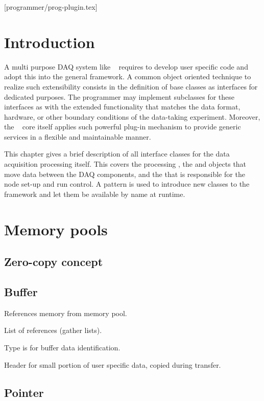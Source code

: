 [programmer/prog-plugin.tex]
\section{Introduction}
A multi purpose DAQ system like \dabc~ requires to develop user specific code and adopt
this into the general framework. A common object oriented technique to realize such
extensibility consists in the definition of base classes as interfaces for dedicated purposes.
The programmer may implement subclasses for these interfaces as 
with the extended functionality that matches the data format, hardware, or other boundary conditions of the
data-taking experiment. Moreover, the  \dabc~ core itself applies such powerful plug-in mechanism to provide 
generic services in a flexible and maintainable manner.   

This chapter gives a brief description of all interface classes for the data acquisition 
processing itself. This covers the processing , the  and 
 objects that move data between the DAQ components, 
and the  that is responsible for the node set-up and run control.
A  pattern is used to introduce new classes to the framework and let them
be available by name at runtime.


\section{Memory pools}

\subsection{Zero-copy concept}

\subsection{Buffer}

References memory from memory pool.
 
List of references (gather lists).

Type is for buffer data identification.

Header for small portion of user specific data, copied during transfer.   


\subsection{Pointer}

